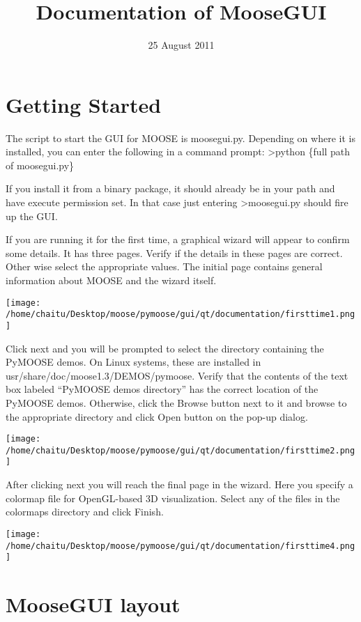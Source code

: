 \documentclass[11pt]{article}
\title{Documentation of MooseGUI}
\author{}
\date{25 August 2011}
\begin{document}
\maketitle

\setcounter{tocdepth}{3}
\tableofcontents
\vspace*{1cm}
\section{Getting Started}
\label{sec-1}


  The script to start the GUI for MOOSE is moosegui.py. Depending on where it is installed, you can enter the following in a command prompt:
  >python \{full path of moosegui.py\}

  If you install it from a binary package, it should already be in your path and have execute permission set. In that case just entering
  >moosegui.py
  should fire up the GUI.

  If you are running it for the first time, a graphical wizard will appear to confirm some details. It has three pages. Verify if the details in these pages are correct. Other wise select the appropriate values. The initial page contains general information about MOOSE and the wizard itself.

  \texttt{[image: /home/chaitu/Desktop/moose/pymoose/gui/qt/documentation/firsttime1.png]}

  Click next and you will be prompted to select the directory containing the PyMOOSE demos. On Linux systems, these are installed in usr/share/doc/moose1.3/DEMOS/pymoose. Verify that the contents of the text box labeled ``PyMOOSE demos directory'' has the correct location of the PyMOOSE demos. Otherwise, click the Browse button next to it and browse to the appropriate directory and click Open button on the pop-up dialog.

  \texttt{[image: /home/chaitu/Desktop/moose/pymoose/gui/qt/documentation/firsttime2.png]}

  After clicking next you will reach the final page in the wizard. Here you specify a colormap file for OpenGL-based 3D visualization. Select any of the files in the colormaps directory and click Finish.

  \texttt{[image: /home/chaitu/Desktop/moose/pymoose/gui/qt/documentation/firsttime4.png]}


\section{MooseGUI layout}
\label{sec-2}
\end{document}
